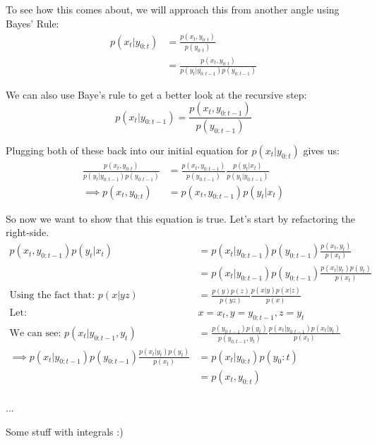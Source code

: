 \documentclass{article}
\begin{document}
To see how this comes about, we will approach this from another angle using Bayes' Rule:
\begin{equation}
\begin{split}
p(x_t|y_{0:t}) &= \frac{p(x_t,y_{0:t})}{p(y_{0:t})}\\
&= \frac{p(x_t,y_{0:t})}{p(y_t|y_{0:t-1})p(y_{0:t-1})}
\end{split}
\end{equation}

We can also use Baye's rule to get a better look at the recursive step:
\begin{equation}
p(x_t|y_{0:t-1}) = \frac{p(x_t,y_{0:t-1})}{p(y_{0:t-1})}
\end{equation}

Plugging both of these back into our initial equation for $p(x_t|y_{0:t})$ gives us:
\begin{equation}
\begin{split}
\frac{p(x_t,y_{0:t})}{p(y_t|y_{0:t-1})p(y_{0:t-1})}
&= \frac{p(x_t,y_{0:t-1})}{p(y_{0:t-1})}\frac{p(y_t|x_t)}{p(y_t|y_{0:t-1})}\\
\implies
p(x_t,y_{0:t}) &= p(x_t,y_{0:t-1})p(y_t|x_t)
\end{split}
\end{equation}

So now we want to show that this equation is true. Let's start by refactoring the right-side.
\begin{equation}
\begin{split}
p(x_t,y_{0:t-1})p(y_t|x_t)
&=p(x_t|y_{0:t-1})p(y_{0:t-1})\frac{p(x_t,y_t)}{p(x_t)}\\
&=p(x_t|y_{0:t-1})p(y_{0:t-1})\frac{p(x_t|y_t)p(y_t)}{p(x_t)}\\
\text{Using the fact that: }
p(x|yz) &= \frac{p(y)p(z)}{p(yz)}\frac{p(x|y)p(x|z)}{p(x)}\\
\text{Let: }
& x=x_t, y=y_{0:t-1}, z = y_t\\
\text{We can see: }
p(x_t|y_{0:t-1},y_t) &= \frac{p(y_{0:t-1})p(y_t)}{p(y_{0:t-1},y_t)}\frac{p(x_t|y_{0:t-1})p(x_t|y_t)}{p(x_t)}\\
\implies
p(x_t|y_{0:t-1})p(y_{0:t-1})\frac{p(x_t|y_t)p(y_t)}{p(x_t)} &= p(x_t|y_{0:t})p(y_0:t)\\
&= p(x_t,y_{0:t})\\
\end{split}
\end{equation}


...


Some stuff with integrals :)
\end{document}
